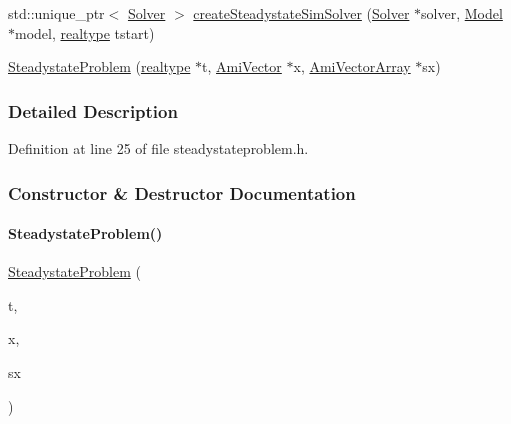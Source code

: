 \begin{DoxyCompactItemize}
std\+::unique\+\_\+ptr$<$ \mbox{\hyperlink{classamici_1_1_solver}{Solver}} $>$ \mbox{\hyperlink{classamici_1_1_steadystate_problem_a8e36c9f8f77bf820e7d6deb34007a47d}{create\+Steadystate\+Sim\+Solver}} (\mbox{\hyperlink{classamici_1_1_solver}{Solver}} $\ast$solver, \mbox{\hyperlink{classamici_1_1_model}{Model}} $\ast$model, \mbox{\hyperlink{namespaceamici_a1bdce28051d6a53868f7ccbf5f2c14a3}{realtype}} tstart)
\item 
\mbox{\hyperlink{classamici_1_1_steadystate_problem_a215594a7e2834ad307f3ef163b512c02}{Steadystate\+Problem}} (\mbox{\hyperlink{namespaceamici_a1bdce28051d6a53868f7ccbf5f2c14a3}{realtype}} $\ast$t, \mbox{\hyperlink{classamici_1_1_ami_vector}{Ami\+Vector}} $\ast$x, \mbox{\hyperlink{classamici_1_1_ami_vector_array}{Ami\+Vector\+Array}} $\ast$sx)
\end{DoxyCompactItemize}


\subsubsection{Detailed Description}


Definition at line 25 of file steadystateproblem.\+h.



\subsubsection{Constructor \& Destructor Documentation}
\mbox{\label{classamici_1_1_steadystate_problem_a215594a7e2834ad307f3ef163b512c02}} 
\paragraph{\texorpdfstring{SteadystateProblem()}{SteadystateProblem()}}
{\footnotesize\ttfamily \mbox{\hyperlink{classamici_1_1_steadystate_problem}{Steadystate\+Problem}} (\begin{DoxyParamCaption}\item[{\mbox{\hyperlink{namespaceamici_a1bdce28051d6a53868f7ccbf5f2c14a3}{realtype}} $\ast$}]{t,  }\item[{\mbox{\hyperlink{classamici_1_1_ami_vector}{Ami\+Vector}} $\ast$}]{x,  }\item[{\mbox{\hyperlink{classamici_1_1_ami_vector_array}{Ami\+Vector\+Array}} $\ast$}]{sx }\end{DoxyParamCaption})}

